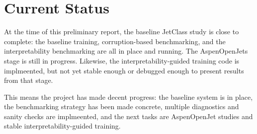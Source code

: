 \documentclass[10pt]{article}
\begin{document}
\section{Current Status}

At the time of this preliminary report, the baseline JetClass study is close to complete: the baseline training, corruption-based benchmarking, and the interpretability benchmarking are all in place and running. The AspenOpenJets stage is still in progress. Likewise, the interpretability-guided training code is implmeented, but not yet stable enough or debugged enough to present results from that stage.

This means the project has made decent progress: the baseline system is in place, the benchmarking strategy has been made concrete, multiple diagnostics and sanity checks are implmeented, and the next tasks are AspenOpenJet studies and stable interpretability-guided training.


\end{document}
